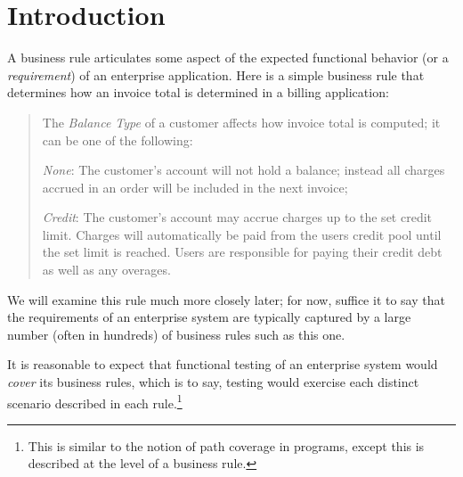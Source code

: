 \section{Introduction}

A business rule articulates some aspect of the expected functional behavior (or a \textit{requirement})
of an enterprise application. Here is a simple business rule that determines how an
invoice total is determined in a billing application:

\begin{quote}
	The \textit{Balance Type} of a customer affects how invoice total is computed; it can be 
	one of the following:

	\textit{None}: The customer's account will not hold a balance; instead all charges accrued 
	in an order will be included in the next invoice;
	
	\textit{Credit}: The customer's account may accrue charges up to the set credit limit. 
	Charges will automatically be paid from the users credit pool until the set limit is reached. 
	Users are responsible for paying their credit debt as well as any overages.
\end{quote}	

We will examine this rule much more closely later; for now, suffice it to say that the requirements 
of an enterprise system are typically captured by a large number (often in hundreds) of business rules
such as this one.

It is reasonable to expect that functional testing of an enterprise system would \textit{cover} its 
business rules, which is to say, testing would exercise each distinct scenario described in each 
rule.\footnote{This is similar to the notion of path coverage in programs, except this is described
at the level of a business rule.}

